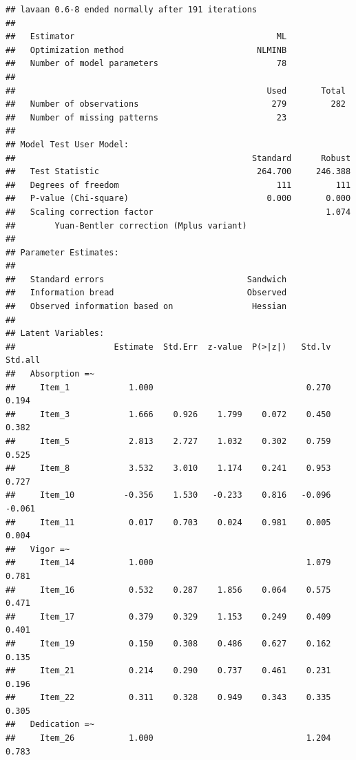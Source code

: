 \documentclass[
  english,
  man]{apa6}
\begin{document}
\begin{verbatim}
## lavaan 0.6-8 ended normally after 191 iterations
## 
##   Estimator                                         ML
##   Optimization method                           NLMINB
##   Number of model parameters                        78
##                                                       
##                                                   Used       Total
##   Number of observations                           279         282
##   Number of missing patterns                        23            
##                                                                   
## Model Test User Model:
##                                                Standard      Robust
##   Test Statistic                                264.700     246.388
##   Degrees of freedom                                111         111
##   P-value (Chi-square)                            0.000       0.000
##   Scaling correction factor                                   1.074
##        Yuan-Bentler correction (Mplus variant)                     
## 
## Parameter Estimates:
## 
##   Standard errors                             Sandwich
##   Information bread                           Observed
##   Observed information based on                Hessian
## 
## Latent Variables:
##                    Estimate  Std.Err  z-value  P(>|z|)   Std.lv  Std.all
##   Absorption =~                                                         
##     Item_1            1.000                               0.270    0.194
##     Item_3            1.666    0.926    1.799    0.072    0.450    0.382
##     Item_5            2.813    2.727    1.032    0.302    0.759    0.525
##     Item_8            3.532    3.010    1.174    0.241    0.953    0.727
##     Item_10          -0.356    1.530   -0.233    0.816   -0.096   -0.061
##     Item_11           0.017    0.703    0.024    0.981    0.005    0.004
##   Vigor =~                                                              
##     Item_14           1.000                               1.079    0.781
##     Item_16           0.532    0.287    1.856    0.064    0.575    0.471
##     Item_17           0.379    0.329    1.153    0.249    0.409    0.401
##     Item_19           0.150    0.308    0.486    0.627    0.162    0.135
##     Item_21           0.214    0.290    0.737    0.461    0.231    0.196
##     Item_22           0.311    0.328    0.949    0.343    0.335    0.305
##   Dedication =~                                                         
##     Item_26           1.000                               1.204    0.783

\end{verbatim}
\end{document}
